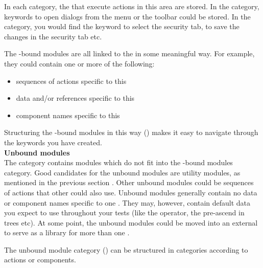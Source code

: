 In each category, the \gdcases{} that execute actions in this area are stored. In the  category, keywords to open dialogs from the menu or the toolbar could be stored. In the  category, you would find the keyword to select the security tab, to save the changes in the security tab etc. 

The  \gdaut{}-bound modules are all linked to the \gdaut{} in some meaningful way. For example, they could contain one or more of the following:
\begin{itemize}
\item sequences of actions specific to this \gdaut{}
\item data and/or references specific to this \gdaut{}
\item component names specific to this \gdaut{}
\end{itemize}

Structuring the \gdaut{}-bound modules in this way () makes it easy to navigate through the keywords you have created. \\


\textbf{Unbound modules}\\
The  category contains modules which do not fit into the \gdaut{}-bound modules category. Good candidates for the unbound modules are utility modules, as mentioned in the previous section . 
Other unbound modules could be sequences of actions that other \gdauts{} could also use. Unbound modules generally contain no data or component names specific to one \gdaut{}. They may, however, contain default data you expect to use throughout your tests (like the operator, the pre-ascend in trees etc). At some point, the unbound modules could be moved into an external \gdproject{} to serve as a library \gdproject{} for more than one \gdaut{} . 

The unbound module category () can be structured in categories according to actions or components.



